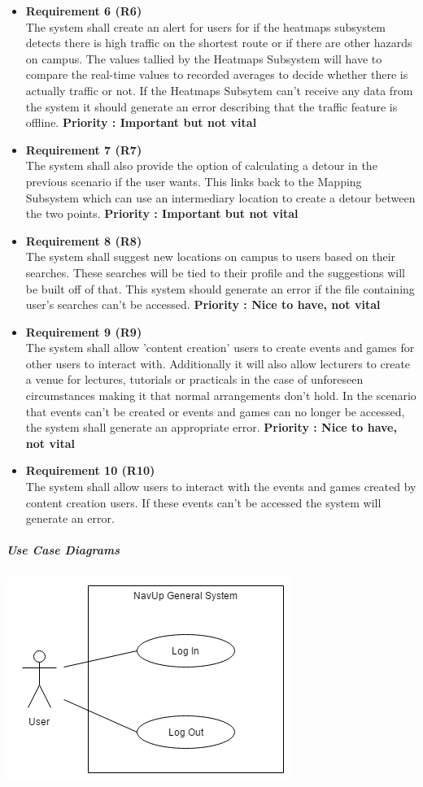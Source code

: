 \documentclass[english]{article}
\begin{document}
\begin{itemize}
					    \item \textbf{Requirement 6 (R6)}\\ The system shall create an alert for users for if the heatmaps subsystem detects there is high traffic on the shortest route or if there are other hazards on campus. The values tallied by the Heatmaps Subsystem will have to compare the real-time values to recorded averages to decide whether there is actually traffic or not. If the Heatmaps Subsytem can't receive any data from the system it should generate an error describing that the traffic feature is offline. \textbf{Priority : Important but not vital}
					    \item \textbf{Requirement 7 (R7)}\\ The system shall also provide the option of calculating a detour in the previous scenario if the user wants. This links back to the Mapping Subsystem which can use an intermediary location to create a detour between the two points. \textbf{Priority : Important but not vital}
					    \item \textbf{Requirement 8 (R8)}\\ The system shall suggest new locations on campus to users based on their searches. These searches will be tied to their profile and the suggestions will be built off of that. This system should generate an error if the file containing user's searches can't be accessed. \textbf{Priority : Nice to have, not vital}
					    \item \textbf{Requirement 9 (R9)}\\ The system shall allow 'content creation' users to create events and games for other users to interact with. Additionally it will also allow lecturers to create a venue for lectures, tutorials or practicals in the case of unforeseen circumstances making it that normal arrangements don't hold. In the scenario that events can't be created or events and games can no longer be accessed, the system shall generate an appropriate error. 
					    \textbf{Priority : Nice to have, not vital}
					    \item \textbf{Requirement 10 (R10)} \\ The system shall allow users to interact with the events and games created by content creation users. If these events can't be accessed the system will generate
					    an error.
					\end{itemize}
				    \subparagraph{Use Case Diagrams}
				       \includegraphics{NavUp_General.png}
\end{document}
